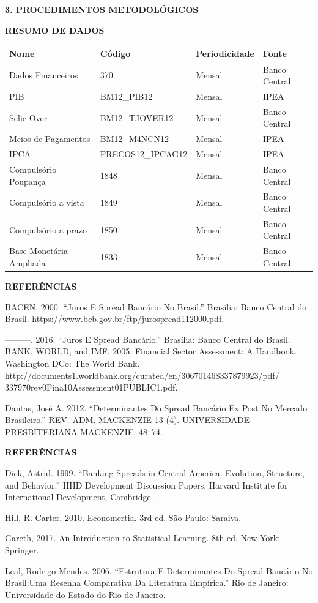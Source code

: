 \documentclass[ignorenonframetext,aspectratio=169,ignorenonframetext]{beamer}
\begin{document}
\begin{frame}{\textbf{3. PROCEDIMENTOS METODOLÓGICOS}}
\protect\hypertarget{procedimentos-metodoluxf3gicos-12}{}

\textbf{RESUMO DE DADOS}

\begin{longtable}[]{@{}llll@{}}
\toprule
\textbf{Nome} & \textbf{Código} & \textbf{Periodicidade} &
\textbf{Fonte}\tabularnewline
\midrule
\endhead
Dados Financeiros & 370 & Mensal & Banco Central\tabularnewline
PIB & BM12\_PIB12 & Mensal & IPEA\tabularnewline
Selic Over & BM12\_TJOVER12 & Mensal & Banco Central\tabularnewline
Meios de Pagamentos & BM12\_M4NCN12 & Mensal & IPEA\tabularnewline
IPCA & PRECOS12\_IPCAG12 & Mensal & IPEA\tabularnewline
Compulsório Poupança & 1848 & Mensal & Banco Central\tabularnewline
Compulsório a vista & 1849 & Mensal & Banco Central\tabularnewline
Compulsório a prazo & 1850 & Mensal & Banco Central\tabularnewline
Base Monetária Ampliada & 1833 & Mensal & Banco Central\tabularnewline
\bottomrule
\end{longtable}

\end{frame}

\begin{frame}{\textbf{REFERÊNCIAS}}
\protect\hypertarget{referuxeancias}{}

BACEN. 2000. ``Juros E Spread Bancário No Brasil.'' Brasília: Banco
Central do Brasil.
\url{https://www.bcb.gov.br/ftp/jurospread112000.pdf}.

---------. 2016. ``Juros E Spread Bancário.'' Brasília: Banco Central do
Brasil. BANK, WORLD, and IMF. 2005. Financial Sector Assessment: A
Handbook. Washington DCo: The World Bank.
\url{http://documents1.worldbank.org/curated/en/306701468337879923/pdf/}
337970rev0Fina10Assessment01PUBLIC1.pdf.

Dantas, José A. 2012. ``Determinantes Do Spread Bancário Ex Post No
Mercado Brasileiro.'' REV. ADM. MACKENZIE 13 (4). UNIVERSIDADE
PRESBITERIANA MACKENZIE: 48--74.

\end{frame}

\begin{frame}{\textbf{REFERÊNCIAS}}
\protect\hypertarget{referuxeancias-1}{}

Dick, Astrid. 1999. ``Banking Spreads in Central America: Evolution,
Structure, and Behavior.'' HIID Development Discussion Papers. Harvard
Institute for International Development, Cambridge.

Hill, R. Carter. 2010. Economertia. 3rd ed. São Paulo: Saraiva.

Gareth, 2017. An Introduction to Statistical Learning. 8th ed. New York:
Springer.

Leal, Rodrigo Mendes. 2006. ``Estrutura E Determinantes Do Spread
Bancário No Brasil:Uma Resenha Comparativa Da Literatura Empírica.'' Rio
de Janeiro: Universidade do Estado do Rio de Janeiro.

\end{frame}
\end{document}
